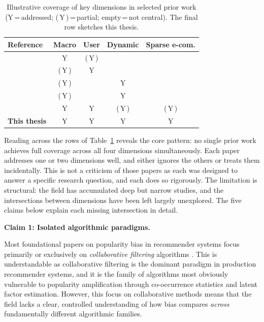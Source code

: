 \documentclass[11pt,a4paper]{report}
\begin{document}
\begin{table}[htbp]
  \centering
  \caption{Illustrative coverage of key dimensions in selected prior work 
  (Y\,=\,addressed; (\,Y\,)\,=\,partial; empty\,=\,not central). 
  The final row sketches this thesis.}
  \label{tab:lit_gap}
  \begin{tabular}{@{}lcccc@{}}
    \toprule
    \textbf{Reference} & \textbf{Macro} & \textbf{User} & \textbf{Dynamic} & \textbf{Sparse e-com.} \\
    \midrule
    \citeauthor{abdollahpouri2019unfairness} \citeyearpar{abdollahpouri2019unfairness} 
      & Y & (\,Y\,) & & \\
    \citeauthor{abdollahpouri2021usercentered} \citeyearpar{abdollahpouri2021usercentered} 
      & (\,Y\,) & Y & & \\
    \citeauthor{mansoury2020feedback} \citeyearpar{mansoury2020feedback} 
      & (\,Y\,) & & Y & \\
    \citeauthor{chaney2018algorithmic} \citeyearpar{chaney2018algorithmic} 
      & (\,Y\,) & & Y & \\
    \citeauthor{klimashevskaia2024survey} \citeyearpar{klimashevskaia2024survey} 
      & Y & Y & (\,Y\,) & (\,Y\,) \\
    \midrule
    \textbf{This thesis} & Y & Y & Y & Y \\
    \bottomrule
  \end{tabular}
\end{table}

Reading across the rows of Table~\ref{tab:lit_gap} reveals the core pattern: no single prior work achieves full coverage across all four dimensions simultaneously. Each paper addresses one or two dimensions well, and either ignores the others or treats them incidentally. This is not a criticism of those papers as each was designed to answer a specific research question, and each does so rigorously. The limitation is structural: the field has accumulated deep but narrow studies, and the intersections between dimensions have been left largely unexplored. The five claims below explain each missing intersection in detail.

\vspace{0.75em}
\noindent\textbf{Claim 1: Isolated algorithmic paradigms.}

Most foundational papers on popularity bias in recommender systems focus primarily or exclusively on \emph{collaborative filtering} algorithms \citep{abdollahpouri2019unfairness, mansoury2020feedback}. This is understandable as collaborative filtering is the dominant paradigm in production recommender systems, and it is the family of algorithms most obviously vulnerable to popularity amplification through co-occurrence statistics and latent factor estimation. However, this focus on collaborative methods means that the field lacks a clear, controlled understanding of how bias compares \emph{across} fundamentally different algorithmic families.
\end{document}
